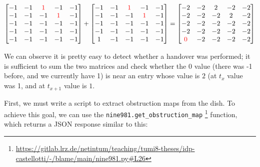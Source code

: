 \documentclass[IN,11pt,twoside,openright,idp,english]{tumthesis}
\begin{document}
$\begin{bmatrix}
-1 & -1 & \color{red}1 &           -1 & -1 \\
-1 & -1 &           -1 & \color{red}1 & -1 \\
-1 & -1 &           -1 &           -1 & -1 \\
-1 & -1 &           -1 &           -1 & -1 \\
-1 & -1 &           -1 &           -1 & -1 \\
\end{bmatrix}
+
\begin{bmatrix}
-1 & -1 & \color{red}1 &           -1 & -1 \\
-1 & -1 &           -1 & \color{red}1 & -1 \\
-1 & -1 &           -1 &           -1 & -1 \\
-1 & -1 &           -1 &           -1 & -1 \\
1 & -1 &            -1 &           -1 & -1 \\
\end{bmatrix}
=
\begin{bmatrix}
          -2 & -2 & 2 & -2 & -2 \\
          -2 & -2 & -2 & 2 & -2 \\
          -2 & -2 & -2 & -2 & -2 \\
          -2 & -2 & -2 & -2 & -2 \\
\color{red}0 & -2 & -2 & -2 & -2 \\
\end{bmatrix}$

\vspace{10mm}

We can observe it is pretty easy to detect whether a handover was performed; it is sufficient to sum the two matrices and check whether the $ 0 $ value (there was -1 before, and we currently have 1) is near an entry whose value is $ 2 $ (at $ t_{x} $ value was 1, and at $ t_{x+1} $ value is $ 1 $. 

First, we must write a script to extract obstruction maps from the dish. To achieve this goal, we can use the \texttt{nine981.get\_obstruction\_map} \footnote{\url{https://gitlab.lrz.de/netintum/teaching/tumi8-theses/idp-castellotti/-/blame/main/nine981.py\#L26}} function, which returns a JSON response similar to this:
\end{document}
